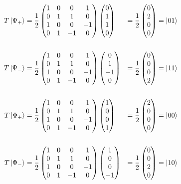 \documentclass[12pt]{article}
\newcommand{\pmat}[1]{\begin{pmatrix}#1\end{pmatrix}}
\newenvironment{answer}{\begingroup\setlength{\leftskip}{-\leftmargin}\begin{framed}}{\end{framed}\endgroup}
\begin{document}
\begin{enumerate}
\begin{answer}
        \begin{alignat*}{3}
            T\ket{\Psi_+} &= \frac{1}{2}\pmat{1&0&0&1\\0&1&1&0\\1&0&0&-1\\0&1&-1&0}\pmat{0\\1\\1\\0}
                &= \frac{1}{2}\pmat{0\\2\\0\\0} &= \ket{01} \\
                \\
            T\ket{\Psi_-} &= \frac{1}{2}\pmat{1&0&0&1\\0&1&1&0\\1&0&0&-1\\0&1&-1&0}\pmat{0\\1\\-1\\0}
                &= \frac{1}{2}\pmat{0\\0\\0\\2} &= \ket{11} \\
                \\
            T\ket{\Phi_+} &= \frac{1}{2}\pmat{1&0&0&1\\0&1&1&0\\1&0&0&-1\\0&1&-1&0}\pmat{1\\0\\0\\1}
                &= \frac{1}{2}\pmat{2\\0\\0\\0} &= \ket{00} \\
                \\
            T\ket{\Phi_-} &= \frac{1}{2}\pmat{1&0&0&1\\0&1&1&0\\1&0&0&-1\\0&1&-1&0}\pmat{1\\0\\0\\-1}
                &= \frac{1}{2}\pmat{0\\0\\2\\0} &= \ket{10} \\
        \end{alignat*}


\end{answer}
\end{enumerate}
\end{document}
